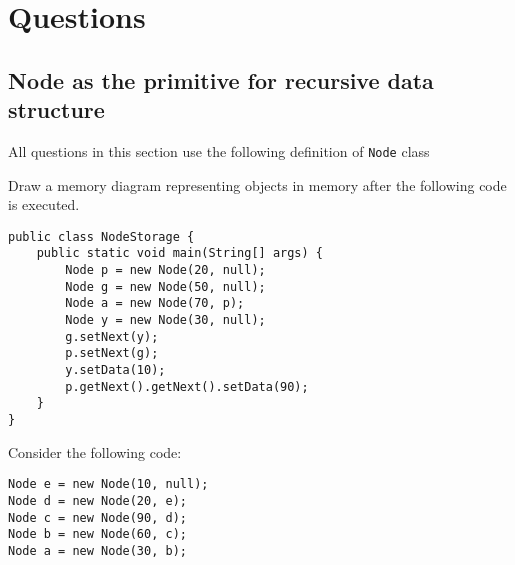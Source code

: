 \section*{Questions}
\begin{questions}

\section{Node as the primitive for recursive data structure}

All questions in this section use the following definition of \texttt{Node} class



\newpage

\question Draw a memory diagram representing objects in memory after the following code is executed.

\begin{lstlisting}
public class NodeStorage {
	public static void main(String[] args) {
		Node p = new Node(20, null);
		Node g = new Node(50, null);
		Node a = new Node(70, p);
		Node y = new Node(30, null);
		g.setNext(y);
		p.setNext(g);
		y.setData(10);
		p.getNext().getNext().setData(90);
	}
}
\end{lstlisting}

\ifprintanswers
{}
\else
\fi

\question Consider the following code:

\begin{lstlisting}
Node e = new Node(10, null);
Node d = new Node(20, e);
Node c = new Node(90, d);
Node b = new Node(60, c);
Node a = new Node(30, b);
\end{lstlisting}

\ifprintanswers
{}
\end{questions}
